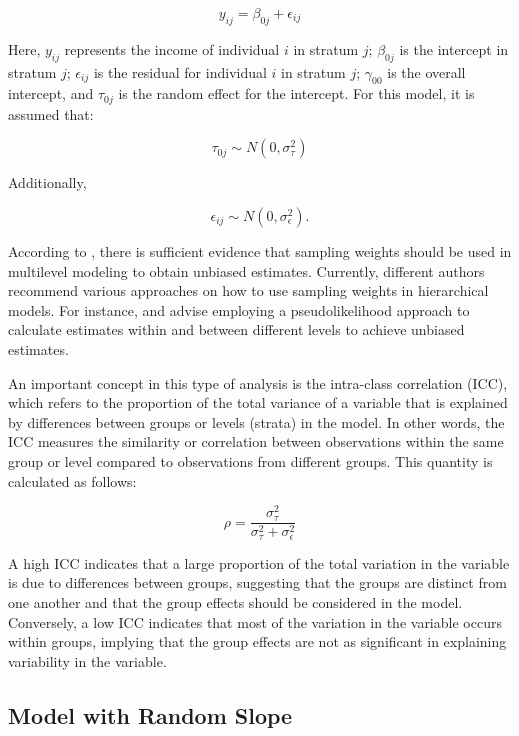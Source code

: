 \documentclass[
  12pt,
]{book}
\begin{document}
\[
y_{ij} = \beta_{0j} + \epsilon_{ij}
\]

Here, \(y_{ij}\) represents the income of individual \(i\) in stratum \(j\); \(\beta_{0j}\) is the intercept in stratum \(j\); \(\epsilon_{ij}\) is the residual for individual \(i\) in stratum \(j\); \(\gamma_{00}\) is the overall intercept, and \(\tau_{0j}\) is the random effect for the intercept. For this model, it is assumed that:

\[
\tau_{0j} \sim N(0, \sigma_{\tau}^{2})
\]

Additionally,

\[
\epsilon_{ij} \sim N(0, \sigma_{\epsilon}^{2}).
\]

According to \citet{cai2013investigation}, there is sufficient evidence that sampling weights should be used in multilevel modeling to obtain unbiased estimates. Currently, different authors recommend various approaches on how to use sampling weights in hierarchical models. For instance, \citet{pfeffermann1998weighting} and \citet{asparouhov2006general} advise employing a pseudolikelihood approach to calculate estimates within and between different levels to achieve unbiased estimates.

An important concept in this type of analysis is the intra-class correlation (ICC), which refers to the proportion of the total variance of a variable that is explained by differences between groups or levels (strata) in the model. In other words, the ICC measures the similarity or correlation between observations within the same group or level compared to observations from different groups. This quantity is calculated as follows:

\[
\rho = \frac{\sigma_{\tau}^{2}}{\sigma_{\tau}^{2} + \sigma_{\epsilon}^{2}}
\]

A high ICC indicates that a large proportion of the total variation in the variable is due to differences between groups, suggesting that the groups are distinct from one another and that the group effects should be considered in the model. Conversely, a low ICC indicates that most of the variation in the variable occurs within groups, implying that the group effects are not as significant in explaining variability in the variable.

\hypertarget{model-with-random-slope}{%
\subsection{Model with Random Slope}\label{model-with-random-slope}}
\end{document}
